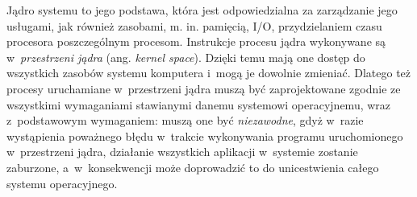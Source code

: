 \documentclass[12pt]{mwart}
\begin{document}
\par
%
\indent
	Jądro systemu to jego podstawa, która jest odpowiedzialna za zarządzanie jego usługami, jak również zasobami, m. in. pamięcią, I/O,
	przydzielaniem czasu procesora poszczególnym procesom. Instrukcje procesu jądra wykonywane są w~\emph{przestrzeni jądra}
  (ang. \emph{kernel space}). Dzięki temu
	mają one dostęp do wszystkich zasobów systemu komputera i~mogą je dowolnie zmieniać. Dlatego też procesy uruchamiane w~przestrzeni
	jądra muszą być zaprojektowane zgodnie ze wszystkimi wymaganiami stawianymi danemu systemowi operacyjnemu, wraz z~podstawowym wymaganiem:
	muszą one być \emph{niezawodne}, gdyż w~razie wystąpienia poważnego błędu w~trakcie wykonywania programu uruchomionego w~przestrzeni jądra,
	działanie wszystkich aplikacji w~systemie zostanie zaburzone, a~w~konsekwencji może doprowadzić to do unicestwienia całego systemu operacyjnego.
\par
%
\end{document}
